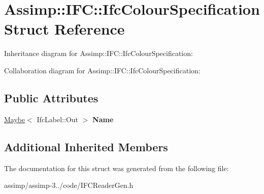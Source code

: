 \hypertarget{struct_assimp_1_1_i_f_c_1_1_ifc_colour_specification}{\section{Assimp\+:\+:I\+F\+C\+:\+:Ifc\+Colour\+Specification Struct Reference}
\label{struct_assimp_1_1_i_f_c_1_1_ifc_colour_specification}
}


Inheritance diagram for Assimp\+:\+:I\+F\+C\+:\+:Ifc\+Colour\+Specification\+:


Collaboration diagram for Assimp\+:\+:I\+F\+C\+:\+:Ifc\+Colour\+Specification\+:
\subsection*{Public Attributes}
\begin{DoxyCompactItemize}
\item 
\hypertarget{struct_assimp_1_1_i_f_c_1_1_ifc_colour_specification_afeeaaf14e90188091dd913f473ec12b1}{\hyperlink{struct_assimp_1_1_s_t_e_p_1_1_maybe}{Maybe}$<$ Ifc\+Label\+::\+Out $>$ {\bfseries Name}}\label{struct_assimp_1_1_i_f_c_1_1_ifc_colour_specification_afeeaaf14e90188091dd913f473ec12b1}

\end{DoxyCompactItemize}
\subsection*{Additional Inherited Members}


The documentation for this struct was generated from the following file\+:\begin{DoxyCompactItemize}
\item 
assimp/assimp-\/3../code/I\+F\+C\+Reader\+Gen.\+h\end{DoxyCompactItemize}

